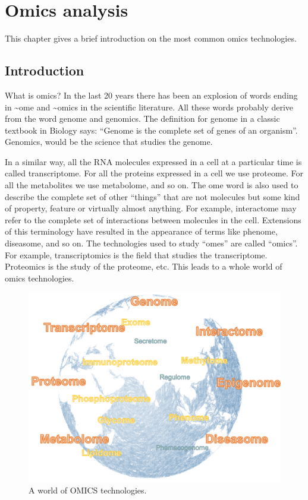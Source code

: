 \documentclass[]{book}
\theoremstyle{definition}
\theoremstyle{definition}
\theoremstyle{definition}
\theoremstyle{remark}
\begin{document}
\chapter{Omics analysis}\label{omics-analysis-1}

This chapter gives a brief introduction on the most common omics
technologies.

\section{Introduction}\label{introduction}

What is omics? In the last 20 years there has been an explosion of words
ending in \textasciitilde{}ome and \textasciitilde{}omics in the
scientific literature. All these words probably derive from the word
genome and genomics. The definition for genome in a classic textbook in
Biology says: ``Genome is the complete set of genes of an organism''.
Genomics, would be the science that studies the genome.

In a similar way, all the RNA molecules expressed in a cell at a
particular time is called transcriptome. For all the proteins expressed
in a cell we use proteome. For all the metabolites we use metabolome,
and so on. The ome word is also used to describe the complete set of
other ``things'' that are not molecules but some kind of property,
feature or virtually almost anything. For example, interactome may refer
to the complete set of interactions between molecules in the cell.
Extensions of this terminology have resulted in the appearance of terms
like phenome, diseasome, and so on. The technologies used to study
``omes'' are called ``omics''. For example, transcriptomics is the field
that studies the transcriptome. Proteomics is the study of the proteome,
etc. This leads to a whole world of omics technologies.

\begin{figure}
\includegraphics[width=19.78in]{pic/omics_1} \caption{A world of OMICS technologies.}\label{fig:omics-1}
\end{figure}
\end{document}
